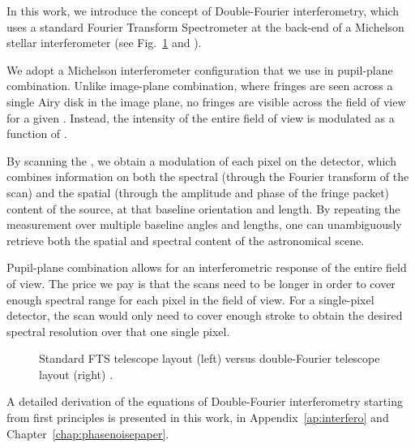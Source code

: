 In this work, we introduce the concept of Double-Fourier interferometry, which uses a standard Fourier Transform Spectrometer at the back-end of a Michelson stellar interferometer (see Fig.~\ref{fig:FTSvsDoubleFourier} and \citet{Mariotti:1988vea}). 


We adopt a Michelson interferometer configuration that we use in pupil-plane combination. Unlike image-plane combination, where fringes are seen across a single Airy disk in the image plane, no fringes are visible across the field of view for a given \OPD. Instead, the intensity of the entire field of view is modulated as a function of \OPD. 

By scanning the \OPD, we obtain a modulation of each pixel on the detector, which combines information on both the spectral (through the Fourier transform of the scan) and the spatial (through the amplitude and phase of the fringe packet) content of the source, at that baseline orientation and length. By repeating the measurement over multiple baseline angles and lengths, one can unambiguously retrieve both the spatial and spectral content of the astronomical scene. 

Pupil-plane combination allows for an interferometric response of the entire field of view. The price we pay is that the \OPD scans need to be longer in order to cover enough spectral range for each pixel in the field of view. For a single-pixel detector, the \OPD scan would only need to cover enough stroke to obtain the desired spectral resolution over that one single pixel.



\begin{figure}[!ht]
	\centering
	
	\caption[FTS vs Double-Fourier]{Standard FTS telescope layout (left) versus double-Fourier telescope layout (right) \citep{Mariotti:1988vea}.}
	\label{fig:FTSvsDoubleFourier}
    \end{figure}

A detailed derivation of the equations of Double-Fourier interferometry starting from first principles is presented in this work, in Appendix~\ref{ap:interfero} and Chapter~\ref{chap:phasenoisepaper}.


